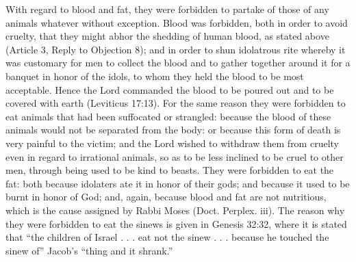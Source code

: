 With regard to blood and fat, they were forbidden to partake of those of any animals whatever without exception. Blood was forbidden, both in order to avoid cruelty, that they might abhor the shedding of human blood, as stated above (Article 3, Reply to Objection 8); and in order to shun idolatrous rite whereby it was customary for men to collect the blood and to gather together around it for a banquet in honor of the idols, to whom they held the blood to be most acceptable. Hence the Lord commanded the blood to be poured out and to be covered with earth (Leviticus 17:13). For the same reason they were forbidden to eat animals that had been suffocated or strangled: because the blood of these animals would not be separated from the body: or because this form of death is very painful to the victim; and the Lord wished to withdraw them from cruelty even in regard to irrational animals, so as to be less inclined to be cruel to other men, through being used to be kind to beasts. They were forbidden to eat the fat: both because idolaters ate it in honor of their gods; and because it used to be burnt in honor of God; and, again, because blood and fat are not nutritious, which is the cause assigned by Rabbi Moses (Doct. Perplex. iii). The reason why they were forbidden to eat the sinews is given in Genesis 32:32, where it is stated that ``the children of Israel . . . eat not the sinew . . . because he touched the sinew of'' Jacob's ``thing and it shrank.''

